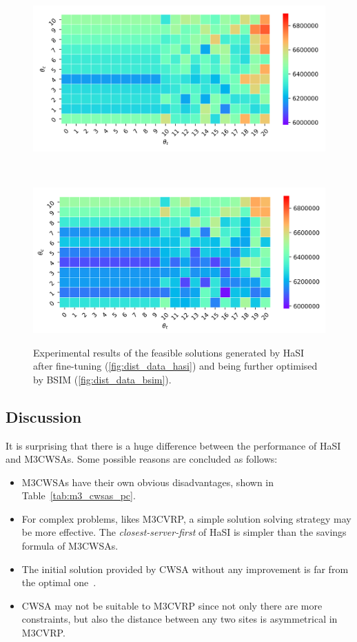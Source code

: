 \documentclass[journal]{IEEEtran}
\begin{document}
\begin{figure}[htbp]
	\centering
	\begin{subfloat}{\includegraphics[width=.45\textwidth]{dist_data.png}}
	\end{subfloat}\\\hfill
	\begin{subfloat}{\includegraphics[width=.45\textwidth]{dist_data_bsim.png}}
	\end{subfloat}
	\caption{\label{fig:fine_tuned_hasi}
		Experimental results of the feasible solutions generated by HaSI after fine-tuning (\ref{fig:dist_data_hasi}) and being further optimised by BSIM (\ref{fig:dist_data_bsim}).}
\end{figure}


\subsection{Discussion}\label{sec:init_discuss}
It is surprising that there is a huge difference between the performance of HaSI and M3CWSAs. Some possible reasons are concluded as follows:
\begin{itemize}%
	\item \label{reason_1} M3CWSAs have their own obvious disadvantages, shown in Table~\ref{tab:m3_cwsas_pc}.
	\item \label{reason_3} For complex problems, likes M3CVRP, a simple solution solving strategy may be more effective. The \emph{closest-server-first} of HaSI is simpler than the savings formula of M3CWSAs.
	\item \label{reason_4} The initial solution provided by CWSA without any improvement is far from the optimal one~\cite{pichpibul2012an}.
	\item \label{reason_2} CWSA may not be suitable to M3CVRP since not only there are more constraints, but also the distance between any two sites is asymmetrical in M3CVRP.
\end{itemize}
\end{document}
